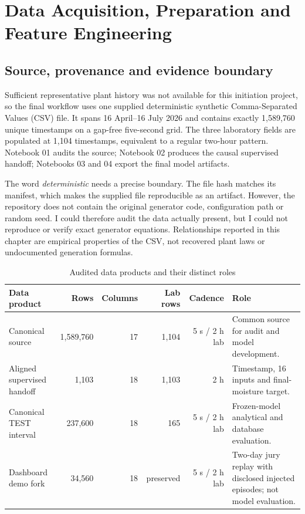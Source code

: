 \chapter{Data Acquisition, Preparation and Feature Engineering}
\label{chap:data}

\section{Source, provenance and evidence boundary}

Sufficient representative plant history was not available for this initiation project, so the final workflow uses one supplied deterministic synthetic Comma-Separated Values (CSV) file. It spans 16 April--16 July 2026 and contains exactly 1,589,760 unique timestamps on a gap-free five-second grid. The three laboratory fields are populated at 1,104 timestamps, equivalent to a regular two-hour pattern. Notebook 01 audits the source; Notebook 02 produces the causal supervised handoff; Notebooks 03 and 04 export the final model artifacts.

The word \emph{deterministic} needs a precise boundary. The file hash matches its manifest, which makes the supplied file reproducible as an artifact. However, the repository does not contain the original generator code, configuration path or random seed. I could therefore audit the data actually present, but I could not reproduce or verify exact generator equations. Relationships reported in this chapter are empirical properties of the CSV, not recovered plant laws or undocumented generation formulas.

\begin{table}[ht]
\centering\small
\caption{Audited data products and their distinct roles}
\label{tab:datasets}
\begin{tabularx}{\textwidth}{@{}p{}rrrrY@{}}
\toprule
Data product & Rows & Columns & Lab rows & Cadence & Role \\
\midrule
Canonical source & 1,589,760 & 17 & 1,104 & 5 s / 2 h lab & Common source for audit and model development. \\
Aligned supervised handoff & 1,103 & 18 & 1,103 & 2 h & Timestamp, 16 inputs and final-moisture target. \\
Canonical TEST interval & 237,600 & 18 & 165 & 5 s / 2 h lab & Frozen-model analytical and database evaluation. \\
Dashboard demo fork & 34,560 & 18 & preserved & 5 s / 2 h lab & Two-day jury replay with disclosed injected episodes; not model evaluation. \\
\bottomrule
\end{tabularx}
\end{table}

